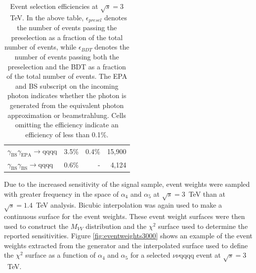 \begin{table}[h!]
\begin{tabular}{ l r r r }
$\gamma_{\text{BS}}\gamma_{\text{EPA}} \rightarrow \text{qqqq}$ & 3.5\% & 0.4\% & 15,900 \\
$\gamma_{\text{BS}}\gamma_{\text{BS}} \rightarrow \text{qqqq}$ & 0.6\% & - & 4,124 \\
\hline
\end{tabular}
\caption[Event selection efficiencies at $\sqrt{s}=3$~TeV.  In the above table, $\epsilon_{presel}$ denotes the number of events passing the preselection as a fraction of the total number of events, while $\epsilon_{BDT}$ denotes the number of events passing both the preselection and the BDT as a fraction of the total number of events.  The EPA and BS subscript on the incoming photon indicates whether the photon is generated from the equivalent photon approximation or beamstrahlung.  Cells omitting the efficiency indicate an efficiency of less than 0.1\%.]{Event selection efficiencies at $\sqrt{s}=3$~TeV.  In the above table, $\epsilon_{presel}$ denotes the number of events passing the preselection as a fraction of the total number of events, while $\epsilon_{BDT}$ denotes the number of events passing both the preselection and the BDT as a fraction of the total number of events.  The EPA and BS subscript on the incoming photon indicates whether the photon is generated from the equivalent photon approximation or beamstrahlung.  Cells omitting the efficiency indicate an efficiency of less than 0.1\%.}
\label{table:selectionsummary3000GeV}
\end{table}

Due to the increased sensitivity of the signal sample, event weights were sampled with greater frequency in the space of $\alpha_{4}$ and $\alpha_{5}$ at $\sqrt{s}=3$~TeV than at $\sqrt{s}=1.4$~TeV analysis.  Bicubic interpolation was again used to make a continuous surface for the event weights.  These event weight surfaces were then used to construct the $M_{VV}$ distribution and the $\chi^{2}$ surface used to determine the reported sensitivities.  Figure \ref{fig:eventweights3000} shows an example of the event weights extracted from the generator and the interpolated surface used to define the $\chi^{2}$ surface as a function of $\alpha_{4}$ and $\alpha_{5}$ for a selected $\nu\nu\text{qqqq}$ event at $\sqrt{s}=3$~TeV.

